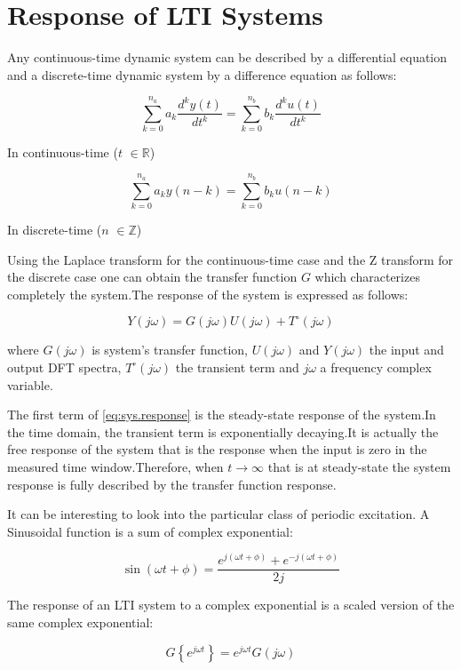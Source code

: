 \documentclass[a4paper,12pt]{report}
\numberwithin{equation}{section}
\begin{document}
\section{Response of LTI Systems}\label{section 4.2}
Any  continuous-time dynamic system can be described by a differential equation and a discrete-time dynamic system by a difference equation as follows:



\[\sum_{k=0}^{n_{a}} a_{k} \frac{d^{k} y(t)}{d t^{k}}=\sum_{k=0}^{n_{b}} b_{k} \frac{d^{k} u(t)}{d t^{k}} \]

In continuous-time ($t$ $\in \mathbb{R}$)

\[\sum_{k=0}^{n_{a}} a_{k} y(n-k)=\sum_{k=0}^{n_{b}} b_{k} u(n-k)\]

In discrete-time  ($n$ $\in \mathbb{Z}$)


Using the Laplace transform for the continuous-time case and the Z transform for the discrete case one can obtain the transfer function $G$ which characterizes completely the system.The response of the system is expressed as follows:

\begin{equation}\label{eq:sys.response}
Y(j\omega)=G\left(j\omega\right) U(j \omega)+T^{\circ}(j\omega)
\end{equation}

where $G\left(j\omega\right)$ is system's transfer function, $U(j \omega)$ and $Y(j\omega)$ the input and output DFT spectra, $T^{\circ}(j\omega)$ the transient term and $j \omega$ a frequency complex variable.

The first term of \eqref{eq:sys.response} is the steady-state response of the system.In the time domain, the transient term is exponentially decaying.It is actually the free response of the system that is the response when the input is zero in the measured time window.Therefore, when $t\rightarrow \infty$ that is at steady-state the system response is fully described by the transfer function response.

It can be interesting to look into the particular class of periodic excitation. A Sinusoidal function is a sum of complex exponential:

\[\sin (\omega t+\phi)=\frac{e^{j(\omega t+\phi)}+e^{-j(\omega t+\phi)}}{2 j}\]

The response of an LTI system to a complex exponential  is a scaled version of the same complex
exponential:

\[G\left\{e^{j \omega t}\right\}=e^{j \omega t} G(j \omega)\]
\end{document}
